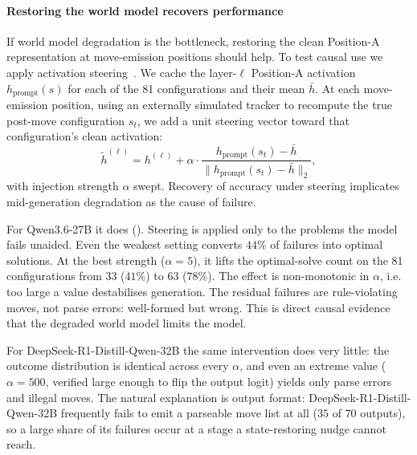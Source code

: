 \documentclass{article} %
\begin{document}
\paragraph{Restoring the world model recovers performance}
\label{sec:lrm-steering}

If world model degradation is the bottleneck, restoring the clean Position-A representation at move-emission positions should help. 
To test causal use we apply activation steering~\citep{turner2023steering}. We cache the layer-$\ell$ Position-A activation $h_{\text{prompt}}(s)$ for each of the 81 configurations and their mean $\bar h$. At each move-emission position, using an externally simulated tracker to recompute the true post-move configuration $s_t$, we add a unit steering vector toward that configuration's clean activation:
\begin{equation}\label{eq:steering}
  \tilde{h}^{(\ell)} = h^{(\ell)} + \alpha \cdot \frac{h_{\text{prompt}}(s_t) - \bar{h}}{\|h_{\text{prompt}}(s_t) - \bar{h}\|_2},
\end{equation}
with injection strength $\alpha$ swept. Recovery of accuracy under steering implicates mid-generation degradation as the cause of failure.

For Qwen3.6-27B it does (). Steering is applied only to the problems the model fails unaided. Even the weakest setting converts $44\%$ of failures into optimal solutions. At the best strength ($\alpha=5$), it lifts the optimal-solve count on the 81 configurations from $33$ ($41\%$) to $63$ ($78\%$). The effect is non-monotonic in $\alpha$, i.e. too large a value destabilises generation. The residual failures are rule-violating moves, not parse errors: well-formed but wrong. This is direct causal evidence that the degraded world model limits the model. %

For DeepSeek-R1-Distill-Qwen-32B the same intervention does very little: the outcome distribution is identical across every $\alpha$, and even an extreme value ($\alpha = 500$, verified large enough to flip the output logit) yields only parse errors and illegal moves. The natural explanation is output format: DeepSeek-R1-Distill-Qwen-32B frequently fails to emit a parseable move list at all ($35$ of $70$ outputs), so a large share of its failures occur at a stage a state-restoring nudge cannot reach.
\end{document}
